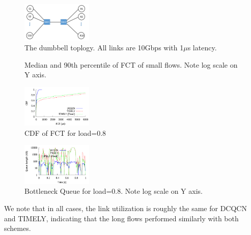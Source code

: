 \begin{figure}[t]
\center
\includegraphics[width=0.3\textwidth]{figures/dumbbell.pdf}
\caption{The dumbbell toplogy. All links are 10Gbps with 1$\mu$s latency.}
\label{fig:fct_topo}
\end{figure}

\begin{figure}[t]
\center
{}
\caption{Median and 90th percentile of FCT of small flows. Note log scale on Y axis.}
\label{fig:fct_results}
\end{figure}

\begin{figure}[t]
\center
\includegraphics[width=0.3\textwidth]{figures/fct_cdf.pdf}
\caption{CDF of FCT for load=0.8}
\label{fig:fct_cdf}
\end{figure}

\begin{figure}[t]
\center
\includegraphics[width=0.3\textwidth]{figures/fct_queue.pdf}
\caption{Bottleneck Queue for load=0.8. Note log scale on Y axis.}
\label{fig:fct_queue}
\end{figure}

We note that in all cases, the link utilization is roughly the same for DCQCN
and TIMELY, indicating that the long flows performed similarly with both
schemes.
